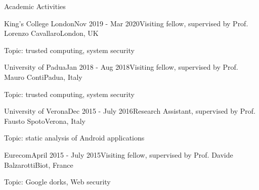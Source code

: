 \documentclass{resume} %
\begin{document}
\begin{rSection}{Academic Activities}

\begin{rSubsection}{King's College London}{Nov 2019 - Mar 2020}{Visiting 
fellow, supervised by Prof. Lorenzo Cavallaro}{London, UK}
	\item Topic: trusted computing, system security
\end{rSubsection}

\begin{rSubsection}{University of Padua}{Jan 2018 - Aug 2018}{Visiting fellow, supervised by Prof. Mauro Conti}{Padua, Italy}
    \item Topic: trusted computing, system security
\end{rSubsection}


\begin{rSubsection}{University of Verona}{Dec 2015 - July 2016}{Research Assistant, supervised by Prof. Fausto Spoto}{Verona, Italy}
\item Topic: static analysis of Android applications
\end{rSubsection}

\begin{rSubsection}{Eurecom}{April 2015 - July 2015}{Visiting fellow, supervised by Prof. Davide Balzarotti}{Biot, France}
\item Topic: Google dorks, Web security
\end{rSubsection}

\end{rSection}
\newpage
\end{document}

